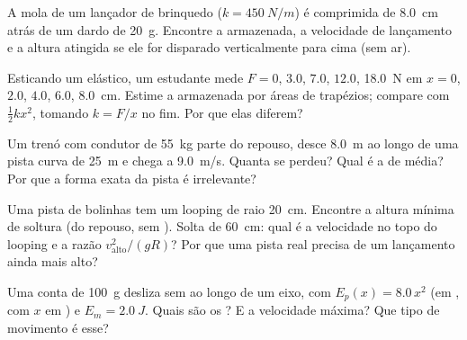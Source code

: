 \begin{exercise}[$\star\star$]\label{exo:g12:work-and-energy:6}
A mola de um lançador de brinquedo ($k = \qty{450}{N/m}$) é comprimida de \qty{8.0}{cm}
atrás de um dardo de \qty{20}{g}. Encontre a  armazenada, a velocidade de
lançamento e a altura atingida se ele for disparado verticalmente para cima (sem ar).
\end{exercise}

\begin{exercise}[$\star\star$]\label{exo:g12:work-and-energy:7}
Esticando um elástico, um estudante mede $F = 0$, $3.0$, $7.0$, $12.0$, \qty{18.0}{N}
em $x = 0$, $2.0$, $4.0$, $6.0$, \qty{8.0}{cm}. Estime a  armazenada por áreas
de trapézios; compare com $\tfrac12 kx^2$, tomando $k = F/x$ no fim. Por que elas
diferem?
\end{exercise}

\begin{exercise}[$\star\star$]\label{exo:g12:work-and-energy:8}
Um trenó com condutor de \qty{55}{kg} parte do repouso, desce \qty{8.0}{m} ao longo de
uma pista curva de \qty{25}{m} e chega a \qty{9.0}{m/s}. Quanta  se
perdeu? Qual é a  de  média? Por que a forma exata da pista é irrelevante?
\end{exercise}

\begin{exercise}[$\star\star$]\label{exo:g12:work-and-energy:9}
Uma pista de bolinhas tem um looping de raio \qty{20}{cm}. Encontre a altura mínima de
soltura (do repouso, sem ). Solta de \qty{60}{cm}: qual é a velocidade no topo do
looping e a razão $v_{\text{alto}}^2/(gR)$? Por que uma pista real precisa de um
lançamento ainda mais alto?
\end{exercise}

\begin{exercise}[$\star\star$]\label{exo:g12:work-and-energy:10}
Uma conta de \qty{100}{g} desliza sem  ao longo de um eixo, com
$E_p(x) = 8.0\,x^2$ (em , com $x$ em ) e $E_m = \qty{2.0}{J}$. Quais são os
? E a velocidade máxima? Que tipo de movimento é esse?
\end{exercise}

